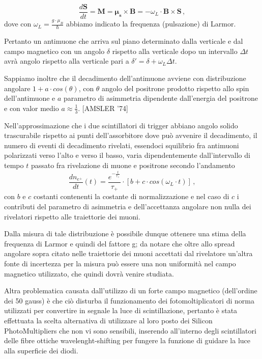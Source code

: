 \begin{equation}
\frac{d\mathbf{S}}{dt}=\mathbf{M}=\boldsymbol{\mu_s}\times\mathbf{B}=-\omega_L \cdot \mathbf{B}\times\mathbf{S} \, ,
\end{equation}
dove con $\omega_L=\frac{g \cdot \mu_B}{\hbar}$ abbiamo indicato la frequenza (pulsazione) di Larmor. \par
Pertanto un antimuone che arriva sul piano determinato dalla verticale e dal campo magnetico con un angolo $\delta$ rispetto alla verticale dopo un intervallo $\Delta t$ avrà angolo rispetto alla verticale pari a $\delta '=\delta + \omega_L \Delta t$. \par
Sappiamo inoltre che il decadimento dell'antimuone avviene con distribuzione angolare $1+a \cdot cos(\theta)$, con $\theta$ angolo del positrone prodotto rispetto allo spin dell'antimuone e $a$ parametro di asimmetria dipendente dall'energia del positrone e con valor medio $a\approx\frac{1}{3}$. [AMSLER '74] \par
Nell'approssimazione che i due scintillatori di trigger abbiano angolo solido trascurabile rispetto ai punti dell'assorbitore dove può avvenire il decadimento, il numero di eventi di decadimento rivelati, essendoci squilibrio fra antimuoni polarizzati verso l'alto e verso il basso, varia dipendentemente dall'intervallo di tempo $t$ passato fra rivelazione di muone e positrone secondo l'andamento
\begin{equation}
\frac{dn_{e^+}}{dt}(t)=\frac{e^{-\frac{t}{\tau_+}}}{\tau_+}\cdot[b+c\cdot cos(\omega_L \cdot t)] \, ,
\end{equation}
con $b$ e $c$ costanti contenenti la costante di normalizzazione e nel caso di $c$ i contributi del parametro di asimmetria e dell'accettanza angolare non nulla dei rivelatori rispetto alle traiettorie dei muoni. \par
Dalla misura di tale distribuzione è possibile dunque ottenere una stima della frequenza di Larmor e quindi del fattore g; da notare che oltre allo spread angolare sopra citato nelle traiettorie dei muoni accettati dal rivelatore un'altra fonte di incertezza per la misura può essere una non uniformità nel campo magnetico utilizzato, che quindi dovrà venire studiata. \par
Altra problematica causata dall'utilizzo di un forte campo magnetico (dell'ordine dei 50 gauss) è che ciò disturba il funzionamento dei fotomoltiplicatori di norma utilizzati per convertire in segnale la luce di scintillazione, pertanto è stata effettuata la scelta alternativa di utilizzare al loro posto dei Silicon PhotoMultipliers che non vi sono sensibili, inserendo all'interno degli scintillatori delle fibre ottiche wavelenght-shifting per fungere la funzione di guidare la luce alla superficie dei diodi.
